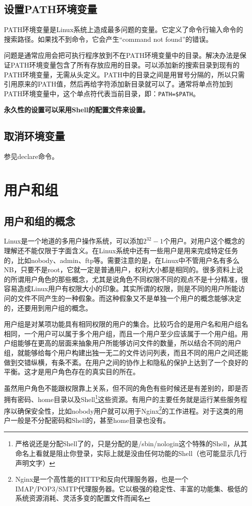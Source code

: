 {\subsection{设置PATH环境变量}
PATH环境变量是Linux系统上造成最多问题的变量。它定义了命令行输入命令的搜索路径。如果找不到命令，它会产生“command not found”的错误。

问题是通常应用会把可执行程序放到不在PATH环境变量中的目录。解决办法是保证PATH环境变量包含了所有存放应用的目录。可以添加新的搜索目录到现有的PATH环境变量，无需从头定义。PATH中的目录之间是用冒号分隔的，所以只需引用原来的PATH值，然后再给字符添加新目录就可以了。通常将单点符加到PATH环境变量中，这个单点符代表当前目录，即：\verb|PATH=$PATH|。

\textbf{永久性的设置可以采用Shell的配置文件来设置。}



\subsection{取消环境变量}
参见declare命令。



\section{用户和组}
\subsection{用户和组的概念}
Linux是一个地道的多用户操作系统，可以添加$2^{32}-1$个用户。对用户这个概念的理解还不能仅限于字面含义。在Linux系统中还有一些用户是用来完成特定任务的，比如nobody、admin、ftp等。需要注意的是，在Linux中不管用户名有多么NB，只要不是root，它就一定是普通用户，权利大小都是相同的。很多资料上说的所谓用户角色的那些概念，尤其是说角色不同权限不同的观点不是十分精准，很容易造成Linux用户有权限大小的印象。其实所谓的权限，则是不同的用户所能访问的文件不同产生的一种假象。而这种假象又不是单独一个用户的概念能够决定的，还要用到用户组的概念。

用户组是对某项功能具有相同权限的用户的集合。比较巧合的是用户名和用户组名相同，一个用户可以属于多个用户组，而且一个用户至少应该属于一个用户组。用户组能够在更高的层面来抽象用户所能够访问文件的数量，所以结合不同的用户组，就能够给每个用户构建出独一无二的文件访问列表，而且不同的用户之间还能做到交错纵横，有条不紊。在用户之间的协作上和隐私的保护上达到了一个良好的平衡。这才是用户角色存在的真实目的所在。

虽然用户角色不能跟权限靠上关系，但不同的角色有些时候还是有差别的，即是否拥有密码、home目录以及Shell\footnote{严格说还是分配Shell了的，只是分配的是/sbin/nologin这个特殊的Shell，从其命名上看就是阻止你登录，实际上就是没由任何功能的Shell（也可能显示几行声明文字）}这些资源。有用户的主要任务就是运行某些服务程序以确保安全性，比如nobody用户就可以用于Nginx\footnote{Nginx是一个高性能的HTTP和反向代理服务器，也是一个IMAP/POP3/SMTP代理服务器。它以极强的稳定性、丰富的功能集、极低的系统资源消耗、灵活多变的配置文件而闻名}的工作进程。对于这类的用户一般是不分配密码和Shell的，甚至home目录也没有。





}
